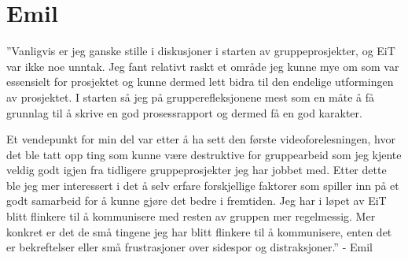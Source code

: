 \section{Emil}
''Vanligvis er jeg ganske stille i diskusjoner i starten av gruppeprosjekter, og EiT var ikke noe unntak.
Jeg fant relativt raskt et område jeg kunne mye om som var essensielt for prosjektet og kunne dermed lett bidra til den endelige utformingen av prosjektet.
I starten så jeg på grupperefleksjonene mest som en måte å få grunnlag til å skrive en god prosessrapport og dermed få en god karakter.

Et vendepunkt for min del var etter å ha sett den første videoforelesningen, hvor det ble tatt opp ting som kunne være destruktive for gruppearbeid som jeg kjente veldig godt igjen fra tidligere gruppeprosjekter jeg har jobbet med.
Etter dette ble jeg mer interessert i det å selv erfare forskjellige faktorer som spiller inn på et godt samarbeid for å kunne gjøre det bedre i fremtiden.
Jeg har i løpet av EiT blitt flinkere til å kommunisere med resten av gruppen mer regelmessig.
Mer konkret er det de små tingene jeg har blitt flinkere til å kommunisere, enten det er bekreftelser eller små frustrasjoner over sidespor og distraksjoner.'' \hfill - Emil
\vspace{\secspace}

